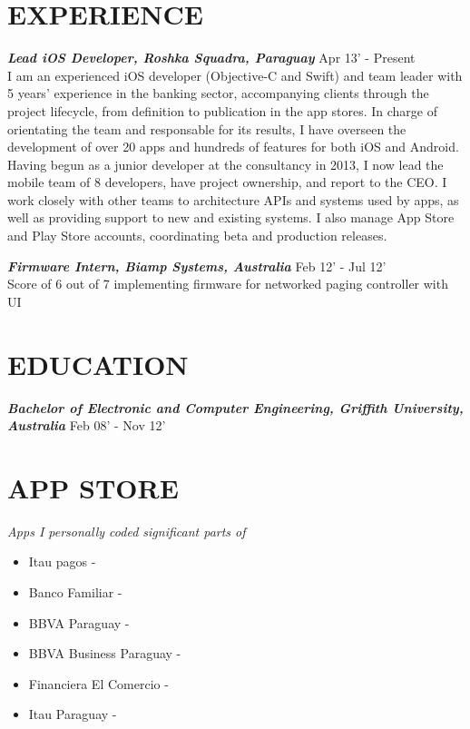 \documentclass[margin]{res}
\begin{document}
\begin{resume}
\section{EXPERIENCE}   
{\sl \textbf{Lead iOS Developer, Roshka Squadra, Paraguay}} \hfill Apr 13' - Present \\
		\break I am an experienced iOS developer (Objective-C and Swift) and team leader with 5 years' experience in the banking sector, accompanying clients through the project lifecycle, from definition to publication in the app stores.\hfill \break
                In charge of orientating the team and responsable for its results, I have overseen the development of over 20 apps and hundreds of features for both iOS and Android. Having begun as a junior developer at the consultancy in 2013, I now lead the mobile team of 8 developers, have project ownership, and report to the CEO.\hfill \break
              	I work closely with other teams to architecture APIs and systems used by apps, as well as providing support to new and existing systems. I also manage App Store and Play Store accounts, coordinating beta and production releases.\hfill 
      
 {\sl \textbf{Firmware Intern, Biamp Systems, Australia}} \hfill Feb 12' - Jul 12' \\
		\break Score of 6 out of 7 implementing firmware for networked paging controller with UI

\section{EDUCATION}   		
 {\sl \textbf{Bachelor of Electronic and Computer Engineering, Griffith University, Australia}} \hfill Feb 08' - Nov 12' \\

\section{APP STORE}   
	{\sl Apps I personally coded significant parts of}    
	\begin{itemize}  \itemsep -2pt %
            \renewcommand\labelitemi{\tiny$\blacksquare$}
	    \item Itau pagos - 
	    \item Banco Familiar - 
	    \item BBVA Paraguay - 
	    \item BBVA Business Paraguay - 
	    \item Financiera El Comercio - 
	    \item Itau Paraguay - 
	\end{itemize}
                   

\end{resume}
\end{document}
